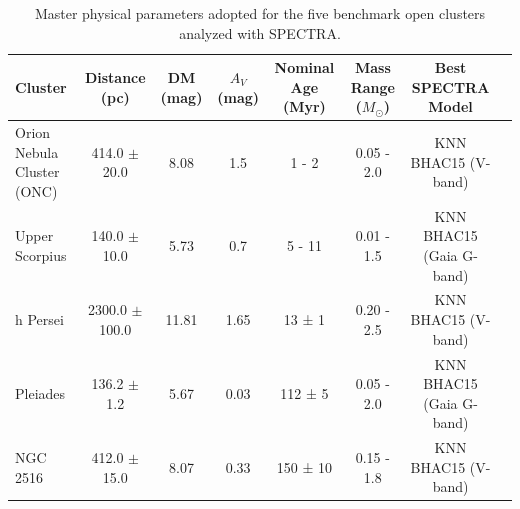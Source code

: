 \begin{table}
\centering
\caption{Master physical parameters adopted for the five benchmark open clusters analyzed with \textsc{SPECTRA}.}
\label{tab:master_cluster_parameters}
\begin{tabular}{lccccccr}
\hline
Cluster & Distance (pc) & DM (mag) & $A_V$ (mag) & Nominal Age (Myr) & Mass Range ($M_\odot$) & Best SPECTRA Model \\
\hline
Orion Nebula Cluster (ONC) & 414.0 $\pm$ 20.0 & 8.08 & 1.5 & 1 - 2 & 0.05 - 2.0 & KNN BHAC15 (V-band) \\
Upper Scorpius & 140.0 $\pm$ 10.0 & 5.73 & 0.7 & 5 - 11 & 0.01 - 1.5 & KNN BHAC15 (Gaia G-band) \\
h Persei & 2300.0 $\pm$ 100.0 & 11.81 & 1.65 & 13 ± 1 & 0.20 - 2.5 & KNN BHAC15 (V-band) \\
Pleiades & 136.2 $\pm$ 1.2 & 5.67 & 0.03 & 112 ± 5 & 0.05 - 2.0 & KNN BHAC15 (Gaia G-band) \\
NGC 2516 & 412.0 $\pm$ 15.0 & 8.07 & 0.33 & 150 ± 10 & 0.15 - 1.8 & KNN BHAC15 (V-band) \\
\hline
\end{tabular}
\end{table}